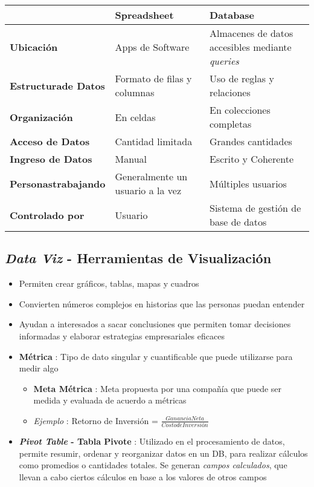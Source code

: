 \begin{table}
    \centering
    \begin{tabular}{|p{3.5cm}|p{5.5cm}|p{5.5cm}|}
        \hline
        & \textbf{Spreadsheet} & \textbf{Database} \\
        \hline
        \textbf{Ubicación} & Apps de Software & Almacenes de datos accesibles mediante \textit{queries} \\
        \hline
        \textbf{Estructura\break de Datos} & Formato de filas y columnas & Uso de reglas y relaciones \\
        \hline
        \textbf{Organización} & En celdas & En colecciones completas \\
        \hline
        \textbf{Acceso de Datos} & Cantidad limitada & Grandes cantidades \\
        \hline
        \textbf{Ingreso de Datos} & Manual & Escrito y Coherente \\
        \hline
        \textbf{Personas\break trabajando} & Generalmente un usuario a la vez & Múltiples usuarios \\
        \hline
        \textbf{Controlado por} & Usuario & Sistema de gestión de base de datos \\
        \hline
    \end{tabular}
\end{table}

\subsection{\textit{Data Viz} - Herramientas de Visualización}
\begin{itemize}
    \item {Permiten crear gráficos, tablas, mapas y cuadros}
    \item {Convierten números complejos en historias que las personas puedan entender}
    \item {Ayudan a interesados a sacar conclusiones que permiten tomar decisiones informadas y elaborar estrategias empresariales eficaces}
    \item {\textbf{Métrica} : Tipo de dato singular y cuantificable que puede utilizarse para medir algo
    \begin{itemize}
        \item {\textbf{Meta Métrica} : Meta propuesta por una compañía que puede ser medida y evaluada de acuerdo a métricas}
        \item {\textit{Ejemplo} : Retorno de Inversión = $\frac{Ganancia Neta}{Costo de Inversión}$}
    \end{itemize}}
    \item {\textbf{\textit{Pivot Table} - Tabla Pivote} : Utilizado en el procesamiento de datos, permite resumir, ordenar y reorganizar datos en un DB, para realizar cálculos como promedios o cantidades totales. Se generan \textit{campos calculados}, que llevan a cabo ciertos cálculos en base a los valores de otros campos}
\end{itemize}

